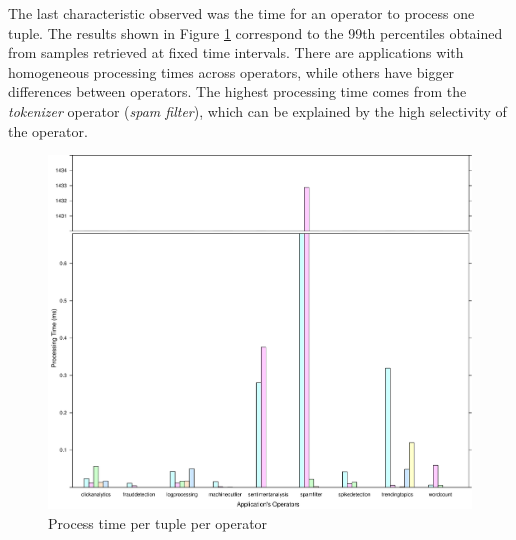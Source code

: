 \documentclass[ppgc,diss,english]{iiufrgs}
\begin{document}
The last characteristic observed was the time for an operator to process one tuple. The results shown in Figure \ref{fig:process_time} correspond to the 99th percentiles obtained from samples retrieved at fixed time intervals. There are applications with homogeneous processing times across operators, while others have bigger differences between operators. The highest processing time comes from the \emph{tokenizer} operator (\emph{spam filter}), which can be explained by the high selectivity of the operator.

\begin{figure}[ht!]
    \centering
	\includegraphics[width=.8\textwidth]{images/process_time.pdf}
	\caption{Process time per tuple per operator}
	\label{fig:process_time}
\end{figure}
\end{document}
